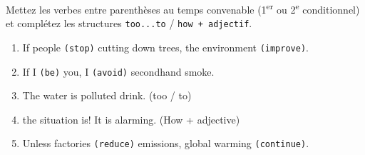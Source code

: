 \documentclass[11pt]{article}
\begin{document}
\begin{exercice}
Mettez les verbes entre parenthèses au temps convenable (1\textsuperscript{er} ou 2\textsuperscript{e} conditionnel) et complétez les structures \texttt{too...to} / \texttt{how + adjectif}.
\begin{enumerate}
    \item If people \texttt{(stop)} cutting down trees, the environment \texttt{(improve)}.
    \item If I \texttt{(be)} you, I \texttt{(avoid)} secondhand smoke.
    \item The water is \underline{\hspace{3cm}} polluted \underline{\hspace{3cm}} drink. (too / to)
    \item \underline{\hspace{3cm}} \underline{\hspace{3cm}} the situation is! It is alarming. (How + adjective)
    \item Unless factories \texttt{(reduce)} emissions, global warming \texttt{(continue)}.
\end{enumerate}
\end{exercice}
\end{document}

